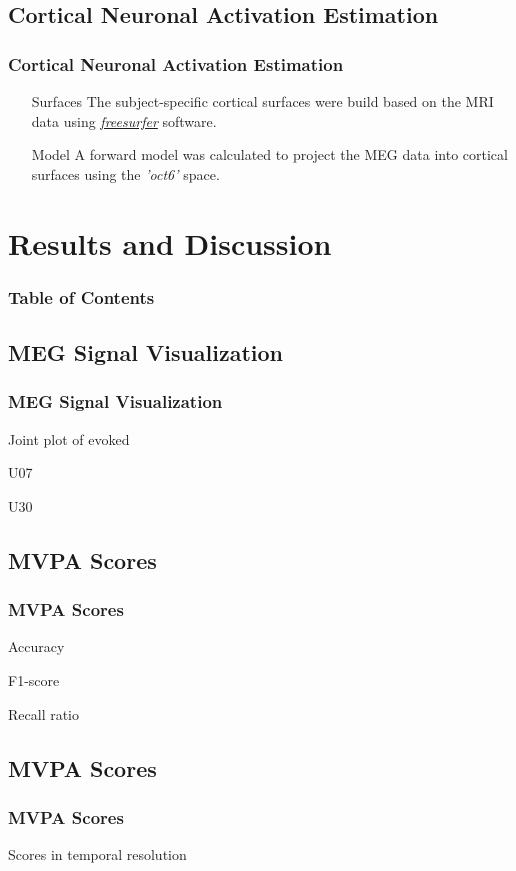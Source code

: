 \documentclass{beamer}
\begin{document}
\subsection{Cortical Neuronal Activation Estimation}
\begin{frame}
    \frametitle{Cortical Neuronal Activation Estimation}

    \begin{itemize}
        \item [Surfaces] The subject-specific cortical surfaces were build based on the MRI data using \hyperlink{https://surfer.nmr.mgh.harvard.edu/}{\emph{freesurfer}} software.
        \item [Model] A forward model was calculated to project the MEG data into cortical surfaces using the \emph{'oct6'} space.
    \end{itemize}

\end{frame}

\section{Results and Discussion}
\begin{frame}[plain]
    \frametitle{Table of Contents}
\end{frame}

\subsection{MEG Signal Visualization}
\begin{frame}
    \frametitle{MEG Signal Visualization}
    Joint plot of evoked

    U07

    U30
\end{frame}

\subsection{MVPA Scores}
\begin{frame}
    \frametitle{MVPA Scores}
    Accuracy

    F1-score

    Recall ratio
\end{frame}


\subsection{MVPA Scores}
\begin{frame}
    \frametitle{MVPA Scores}
    Scores in temporal resolution
\end{frame}
\end{document}
